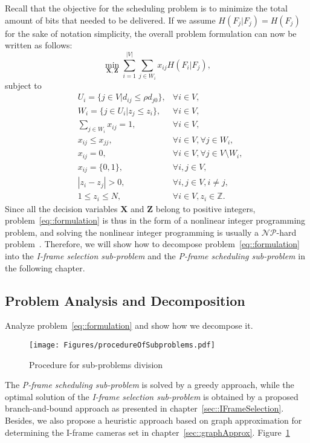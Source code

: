 Recall that the objective for the scheduling problem is to minimize the total amount of bits that needed to be delivered.
If we assume $H(F_j|F_j) = H(F_j)$ for the sake of notation simplicity, the overall problem formulation can now be written as follows:
\begin{equation*}
\underset{\mathbf{X}, \mathbf{Z}}{\min}
\sum_{i=1}^{|V|} \sum_{j \in W_i}  x_{ij} H(F_i|F_j),
\end{equation*}
subject to
\begin{align}
&U_i = \{ j \in V | d_{ij} \leq \rho d_{j0} \}, &\forall i \in V, \nonumber \\
&W_i = \{ j \in U_i | z_j \leq z_i \}, &\forall i \in V, \nonumber \\
&\sum_{j \in W_i} x_{ij} = 1, &\forall i \in V, \nonumber \\
&x_{ij} \leq x_{jj}, &\forall i \in V, \forall j \in W_i, \nonumber \\
&x_{ij} = 0, &\forall i \in V, \forall j \in V \setminus W_i, \nonumber \\
&x_{ij} = \{0,1\}, &\forall i,j \in V, \nonumber \\
&|z_i - z_j| > 0, &\forall i,j \in V, i \neq j, \nonumber \\
&1 \leq z_i \leq N, &\forall i \in V, z_i \in \mathbb{Z}.
\label{eq::formulation}
\end{align}
Since all the decision variables $\mathbf{X}$ and $\mathbf{Z}$ belong to positive integers, problem~\eqref{eq::formulation} is thus in the form of a nonlinear integer programming problem, and solving the nonlinear integer programming is usually a $\mathcal{NP}$-hard problem~\cite{NIP}.
Therefore, we will show how to decompose problem~\eqref{eq::formulation} into the \emph{I-frame selection sub-problem} and the \emph{P-frame scheduling sub-problem} in the following chapter.
%
\subsection{Problem Analysis and Decomposition}
{\color{red} Analyze problem~\eqref{eq::formulation} and show how we decompose it.}
\begin{figure}
\begin{center}
\texttt{[image: Figures/procedureOfSubproblems.pdf]}
\caption{\label{fig::subProbProcedure}Procedure for sub-problems division}
\end{center}
\end{figure}
The \emph{P-frame scheduling sub-problem} is solved by a greedy approach, while the optimal solution of the \emph{I-frame selection sub-problem} is obtained by a proposed branch-and-bound approach as presented in chapter~\ref{sec::IFrameSelection}.
Besides, we also propose a heuristic approach based on graph approximation for determining the I-frame cameras set in chapter~\ref{sec::graphApprox}.
Figure~\ref{fig::subProbProcedure}